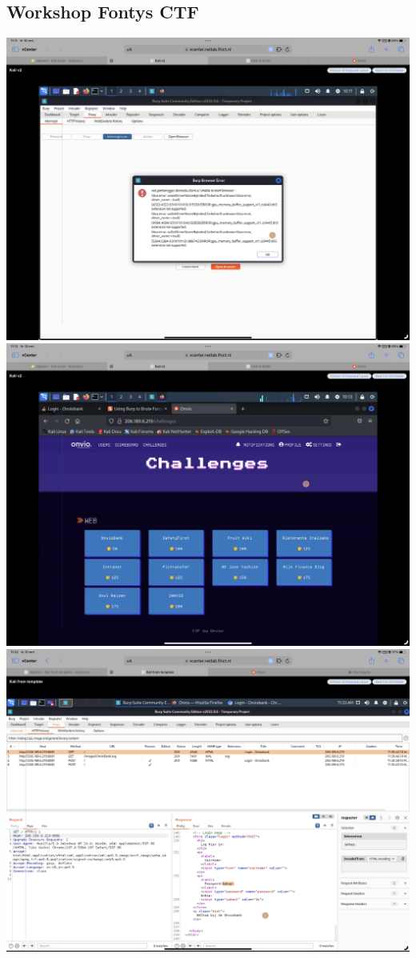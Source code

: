 \documentclass[12pt, letterpaper]{article}
\begin{document}
\subsection{Workshop Fontys CTF}
\includegraphics[width=.8\linewidth]{fotos/Week 4/Ctf/IMG_0397.png}
\includegraphics[width=.8\linewidth]{fotos/Week 4/Ctf/IMG_0398.png}
\includegraphics[width=.8\linewidth]{fotos/Week 4/Ctf/IMG_0399.png}

\newpage
\end{document}
